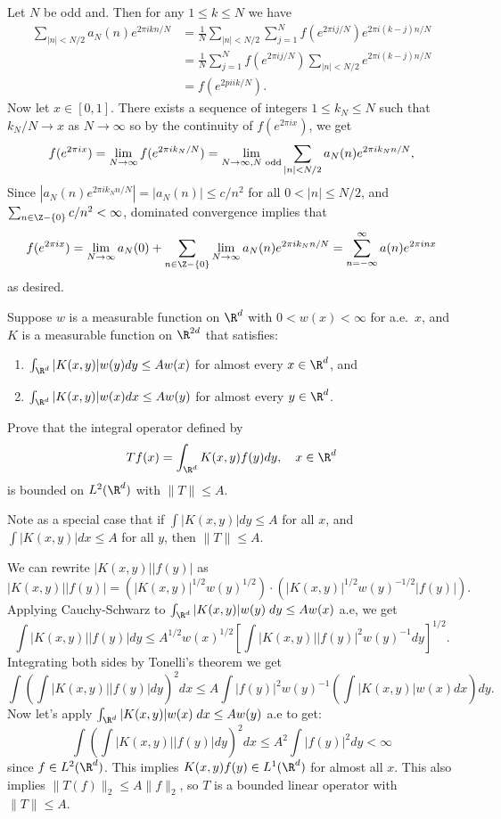 \documentclass[11pt,letterpaper]{article}
\begin{document}
\begin{solution}
\quad Let $N$ be odd and. Then for any $1 \leq k \leq N$ we have
\[
    \begin{aligned}
        \sum_{|n| < N/2}a_N(n)e^{2\pi i kn/N} &= \frac1N\sum_{|n| < N/2} \sum_{j=1}^N f(e^{2\pi i j/N})e^{2\pi i (k-j)n/N} \\
        &= \frac{1}{N}\sum_{j=1}^Nf(e^{2\pi i j/N})\sum_{|n| < N/2}e^{2\pi i (k-j)n/N}\\
        & = f(e^{2pi i k / N}).
    \end{aligned}
\] 
Now let $x\in [0,1]$. There exists a sequence of integers $1 \leq k_N \leq N$ such that $k_N/N \to x$ as $N \to \infty$ so by the continuity of $f(e^{2\pi i x})$, we get
\[
f(e^{2\pi i x}) = \lim_{N \to \infty} f(e^{2\pi i k_N/N}) = \lim_{N \to \infty, N\text{ odd}} \sum_{|n| < N/2} a_N(n)e^{2\pi i k_Nn/N},\vspace{-4pt}
\]
Since $|a_N(n)e^{2\pi i k_Nn/N}| = |a_N(n)| \leq c/n^2$ for all $0 < |n| \leq N/2$, and $\sum_{n \in \Z-\{0\}} c/n^2 < \infty$, dominated convergence implies that
\[
f(e^{2\pi i x}) = \lim_{N \to \infty} a_N(0) + \sum_{n \in \Z-\{0\}} \lim_{N \to \infty} a_N(n)e^{2\pi i k_Nn/N} = \sum_{n=-\infty}^\infty a(n)e^{2\pi i nx}
\]
as desired.
\end{solution}

\begin{problem}
    Suppose $w$ is a measurable function on $\R^d$ with $0 < w(x) < \infty$ for a.e.\ $x$, and $K$ is a measurable function on $\R^{2d}$ that satisfies:
\begin{enumerate}[label=(\roman*)]
    \item $\int_{\R^d} |K(x,y)|w(y)dy \leq Aw(x)$ for almost every $x\in \R^d$, and
    \item $\int_{\R^d} |K(x,y)|w(x)dx \leq Aw(y)$ for almost every $y\in \R^d$.
\end{enumerate}
Prove that the integral operator defined by
\[
Tf(x) = \int_{\R^d}K(x,y)f(y)dy,\quad x \in \R^d
\]
is bounded on $L^2(\R^d)$ with $\|T\|\leq A$.

Note as a special case that if $\int |K(x,y)|dy \leq A$ for all $x$, and $\int |K(x,y)|dx \leq A$ for all $y$, then $\|T\| \leq A$.
\end{problem}
\begin{solution}
\quad We can rewrite $|K(x,y)||f(y)|$ as
\[
    |K(x,y)||f(y)| = \left(|K(x,y)|^{1 /2} w(y)^{1 /2}\right)\cdot \left(|K(x,y)|^{1/2}w(y)^{- 1/2}|f(y)|\right)
.\] 
Applying Cauchy-Schwarz to $\int_{\R^d} |K(x,y)|w(y)\; dy \leq A w(x)$ a.e, we get
\[
    \int |K(x,y)||f(y)|dy \leq A^{1/2}w(x)^{1/2}\left[\int |K(x,y)||f(y)|^2w(y)^{-1}dy\right]^{1/2}
.\] 
Integrating both sides by Tonelli's theorem we get
\[
    \int\left(\int |K(x,y)||f(y)|dy\right)^2dx \leq A\int |f(y)|^2w(y)^{-1}\left(\int|K(x,y)|w(x)dx\right)dy
.\] 
Now let's apply $\int_{\R^d} |K(x,y)|w(x)\;dx \leq Aw(y)$ a.e to get:
\[
    \int\left(\int |K(x,y)||f(y)|dy\right)^2dx \leq A^2\int |f(y)|^2 dy < \infty
\]  
since $f\in L^2(\R^d)$. This implies $K(x,y)f(y)\in L^1(\R^d)$ for almost all $x$. This also implies $\|T(f)\|_2 \leq A\|f\|_2$, so $T$ is a bounded linear operator with $\|T\|\leq A$.
\end{solution}
\end{document}
